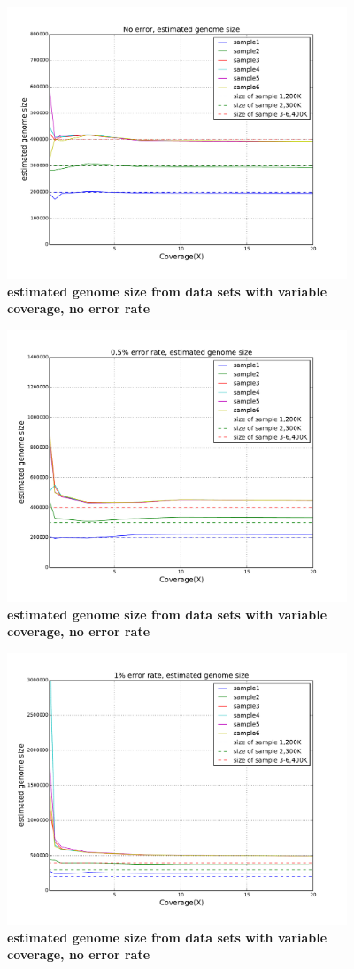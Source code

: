 \begin{figure}[!ht]
 \centerline{\includegraphics[width=4in]{./figures/alpha_by_coverage_0e.pdf}}
\caption{\bf estimated genome size from data sets with variable coverage, no error rate}
\label{fig:alpha_by_coverage_0e}
\end{figure}

\begin{figure}[!ht]
 \centerline{\includegraphics[width=4in]{./figures/alpha_by_coverage_0005e.pdf}}
\caption{\bf estimated genome size from data sets with variable coverage, no error rate}
\label{fig:alpha_by_coverage_0005e}
\end{figure}

\begin{figure}[!ht]
 \centerline{\includegraphics[width=4in]{./figures/alpha_by_coverage_001e.pdf}}
\caption{\bf estimated genome size from data sets with variable coverage, no error rate}
\label{fig:alpha_by_coverage_001e}
\end{figure}


